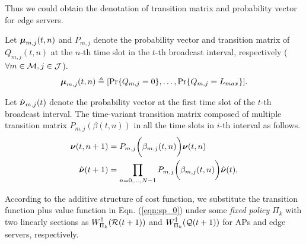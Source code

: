 Thus we could obtain the denotation of transition matrix and probability vector for edge servers.
\begin{definition}
    Let $\boldsymbol{\mu}_{m,j}(t,n)$ and $P_{m,j}$ denote the probability vector and transition matrix of $Q_{m,j}(t,n)$ at the $n$-th time slot in the $t$-th broadcast interval, respectively ($\forall m\in\mathcal{M}, j\in\mathcal{J}$).
    \begin{align}
        \boldsymbol{\mu}_{m,j}(t,n) \triangleq [\Pr\{Q_{m,j}=0\}, \dots, \Pr\{Q_{m,j}=L_{max}\}].
    \end{align}

    Let $\hat{\boldsymbol{\nu}}_{m,j}(t)$ denote the probability vector at the first time slot of the $t$-th broadcast interval.
    The time-variant transition matrix composed of multiple transition matrix $P_{m,j}(\beta({t,n}))$ in all the time slots in $i$-th interval as follows.
    \begin{align}
        \boldsymbol{\nu}({t,n+1}) &= P_{m,j}\bigg(\beta_{m,j}({t,n})\bigg) \boldsymbol{\nu}({t,n})
        \\
        \hat{\boldsymbol{\nu}}(t+1) &= \prod_{n=0,\dots,N-1} P_{m,j}\bigg(\beta_{m,j}({t,n})\bigg) \hat{\boldsymbol{\nu}}(t),
        \label{eqn_4}
    \end{align}
\end{definition}

According to the additive structure of cost function, we substitute the transition function plus value function in Eqn. (\ref{eqn:sp_0}) under some \emph{fixed policy} $\Pi_{k}$ with two linearly sections as $W^{\dagger}_{\Pi_{k}}(\mathcal{R}(t+1))$ and $W^{\ddagger}_{\Pi_{k}}(\mathcal{Q}(t+1))$ for APs and edge servers, respectively.

